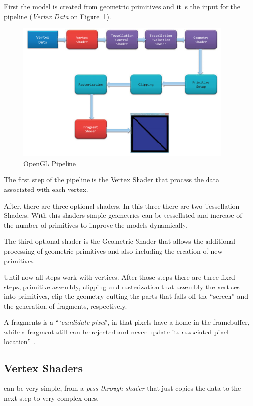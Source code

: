 First the model is created from geometric primitives and it is the input for the pipeline (\emph{Vertex Data} on Figure~\ref{fig:OGLPipeline}). 

\begin{figure}[htbp]
	\centering
	\includegraphics[width=0.95\textwidth]{images/OpenGL/pipeline.png}
	\caption{OpenGL Pipeline \cite{shreiner2013opengl}}
	\label{fig:OGLPipeline}
\end{figure}


The first step of the pipeline is the Vertex Shader that process the data associated with each vertex. 

After, there are three optional shaders. In this three there are two Tessellation Shaders. With this shaders simple geometries can be tessellated and increase of the number of primitives to improve the models dynamically.

The third optional shader is the Geometric Shader that allows the additional processing of geometric primitives and also including the creation of new primitives.

Until now all steps work with vertices. After those steps there are three fixed steps, primitive assembly, clipping and rasterization that assembly the vertices into primitives, clip the geometry cutting the parts that falls off the ``screen'' and the generation of fragments, respectively.

A fragments is a ``‘\emph{candidate pixel}’, in that pixels have a home in the framebuffer, while a fragment still can be rejected and never update its associated pixel location'' \cite{shreiner2013opengl}.

\subsection{Vertex Shaders} %
\label{sub:vertex_shaders}
can be very simple, from a \emph{pass-through shader} that just copies the data to the next step to very complex ones.


